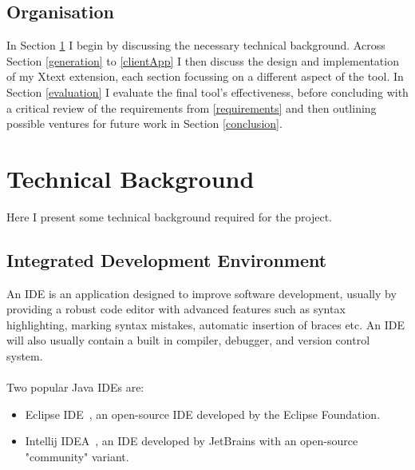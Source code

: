 \documentclass{article}
\begin{document}
\subsection{Organisation} 
In Section \ref{technicalBackground} I begin by discussing the necessary technical background. Across Section \ref{generation} to \ref{clientApp} I then discuss the design and implementation of my Xtext extension, each section focussing on a different aspect of the tool. In Section \ref{evaluation} I evaluate the final tool's effectiveness, before concluding with a critical review of the requirements from \ref{requirements} and then outlining possible ventures for future work in Section \ref{conclusion}. 

\section{Technical Background}\label{technicalBackground}
Here I present some technical background required for the project.
\subsection{Integrated Development Environment}
An IDE is an application designed to improve software development, usually by providing a robust code editor with advanced features such as syntax highlighting, marking syntax mistakes, automatic insertion of braces etc. An IDE will also usually contain a built in compiler, debugger, and version control system. 
\\
\\
Two popular Java IDEs are:
\begin{itemize}
\item Eclipse IDE~\cite{eclipse}, an open-source IDE developed by the Eclipse Foundation.
\item Intellij IDEA~\cite{intellij}, an IDE developed by JetBrains with an open-source "community" variant.
\end{itemize}
%
\end{document}
